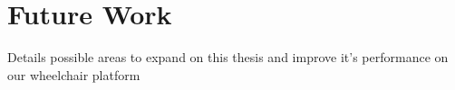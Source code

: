 \section{Future Work}

Details possible areas to expand on this thesis and improve it's performance on our wheelchair platform

